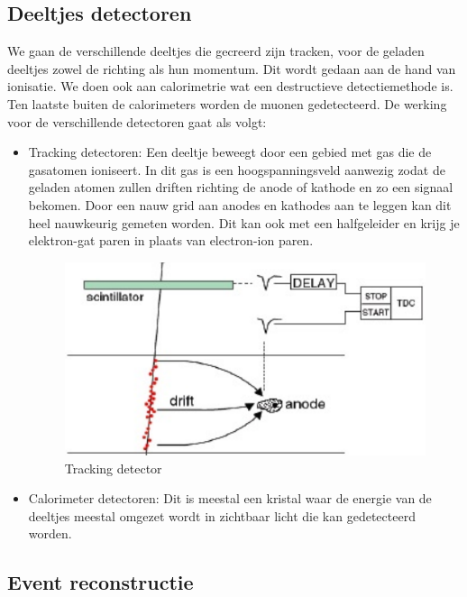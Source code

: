 \documentclass[../main.tex]{subfiles}
\begin{document}
\subsection{Deeltjes detectoren}%
\label{sub:deeltjes_detectoren}

We gaan de verschillende deeltjes die gecreerd zijn tracken, voor de geladen deeltjes zowel de richting als hun momentum. Dit wordt gedaan aan de hand van ionisatie. We doen ook aan calorimetrie wat een destructieve detectiemethode is. Ten laatste buiten de calorimeters worden de muonen gedetecteerd. De werking voor de verschillende detectoren gaat als volgt:
\begin{itemize}
    \item Tracking detectoren: Een deeltje beweegt door een gebied met gas die de gasatomen ioniseert. In dit gas is een hoogspanningsveld aanwezig zodat de geladen atomen zullen driften richting de anode of kathode en zo een signaal bekomen. Door een nauw grid aan anodes en kathodes aan te leggen kan dit heel nauwkeurig gemeten worden. Dit kan ook met een halfgeleider en krijg je elektron-gat paren in plaats van electron-ion paren.
        \begin{figure}[h]
            \centering
            \includegraphics[width=0.8\linewidth]{introduction_and_review/tracking_detector.png}
            \caption{Tracking detector}%
            \label{fig:tracking_detector}
        \end{figure}
    \item Calorimeter detectoren: Dit is meestal een kristal waar de energie van de deeltjes meestal omgezet wordt in zichtbaar licht die kan gedetecteerd worden.
\end{itemize}

\subsection{Event reconstructie}%
\label{sub:event_reconstructie}
\end{document}
